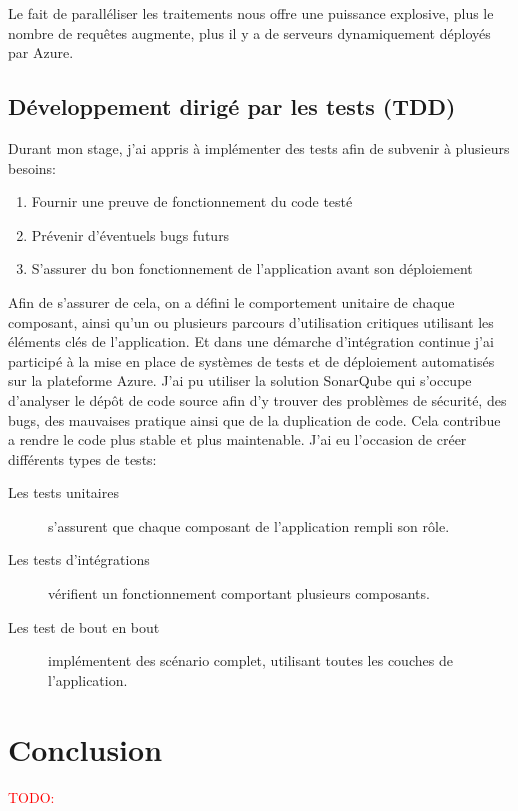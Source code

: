 \documentclass[12pt, a4paper]{report}
\makeatletter
\newcommand\TODO[1]{\textcolor{red}{TODO\@: #1}}
\makeatother
\begin{document}
                Le fait de paralléliser les traitements nous offre une puissance explosive, plus le nombre de requêtes augmente, plus il y a de serveurs dynamiquement déployés par Azure.\newline
        \section{Développement dirigé par les tests (TDD)}
            Durant mon stage, j'ai appris à implémenter des tests afin de subvenir à plusieurs besoins\@:
            \begin{enumerate}
                \item Fournir une preuve de fonctionnement du code testé
                \item Prévenir d'éventuels bugs futurs
                \item S'assurer du bon fonctionnement de l'application avant son déploiement
            \end{enumerate}
            Afin de s'assurer de cela, on a défini le comportement unitaire de chaque composant, ainsi qu'un ou plusieurs parcours d'utilisation critiques utilisant les éléments clés de l'application.\newline
            Et dans une démarche d'intégration continue j'ai participé à la mise en place de systèmes de tests et de déploiement automatisés sur la plateforme Azure.\newline
                J'ai pu utiliser la solution SonarQube qui s'occupe d'analyser le dépôt de code source afin d'y trouver des problèmes de sécurité, des bugs, des mauvaises pratique ainsi que de la duplication de code.\newline
                Cela contribue a rendre le code plus stable et plus maintenable.\newline
                J'ai eu l'occasion de créer différents types de tests\@:
                \begin{description}
                    \item [Les tests unitaires] s'assurent que chaque composant de l'application rempli son rôle.
                    \item [Les tests d'intégrations] vérifient un fonctionnement comportant plusieurs composants.
                    \item [Les test de bout en bout] implémentent des scénario complet, utilisant toutes les couches de l'application.
                \end{description}
    \chapter{Conclusion}
        \TODO{}
	\makeutbmbackcover{}
\end{document}
